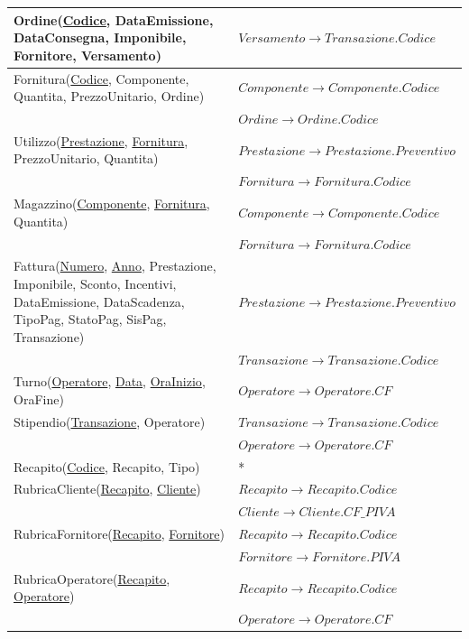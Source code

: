 \begin{longtable}{| p{8cm} | p{6.5cm} |}
			\hline
			Ordine(\underline{Codice}, DataEmissione, DataConsegna, Imponibile, Fornitore, Versamento) &
			$Versamento \rightarrow Transazione.Codice$ \\
			\hline
			Fornitura(\underline{Codice}, Componente, Quantita, PrezzoUnitario, Ordine) &
			$Componente \rightarrow Componente.Codice$ \\
			& $Ordine \rightarrow Ordine.Codice$ \\
			\hline
			Utilizzo(\underline{Prestazione}, \underline{Fornitura}, PrezzoUnitario, Quantita) &
			$Prestazione \rightarrow Prestazione.Preventivo$ \\
			& $Fornitura \rightarrow Fornitura.Codice$ \\
			\hline
			Magazzino(\underline{Componente}, \underline{Fornitura}, Quantita) &
			$Componente \rightarrow Componente.Codice$ \\
			& $Fornitura \rightarrow Fornitura.Codice$ \\
			\hline
			Fattura(\underline{Numero}, \underline{Anno}, Prestazione, Imponibile, Sconto, Incentivi, DataEmissione, DataScadenza, TipoPag, StatoPag, SisPag, Transazione) &
			$Prestazione \rightarrow Prestazione.Preventivo$ \\
			& $Transazione \rightarrow Transazione.Codice$ \\
			\hline
			Turno(\underline{Operatore}, \underline{Data}, \underline{OraInizio}, OraFine) &
			$Operatore \rightarrow Operatore.CF$ \\
			\hline
			Stipendio(\underline{Transazione}, Operatore) &
			$Transazione \rightarrow Transazione.Codice$ \\
			& $Operatore \rightarrow Operatore.CF$ \\
			\hline
			Recapito(\underline{Codice}, Recapito, Tipo) &
			* \\ \hline
			RubricaCliente(\underline{Recapito}, \underline{Cliente}) &
			$Recapito \rightarrow Recapito.Codice$ \\
			& $Cliente \rightarrow Cliente.CF\_PIVA$ \\
			\hline
			RubricaFornitore(\underline{Recapito}, \underline{Fornitore}) &
			$Recapito \rightarrow Recapito.Codice$ \\
			& $Fornitore \rightarrow Fornitore.PIVA$ \\
			\hline
			RubricaOperatore(\underline{Recapito}, \underline{Operatore}) &
			$Recapito \rightarrow Recapito.Codice$ \\
			& $Operatore \rightarrow Operatore.CF$ \\
			\hline

		\end{longtable}
	\vspace{2ex}